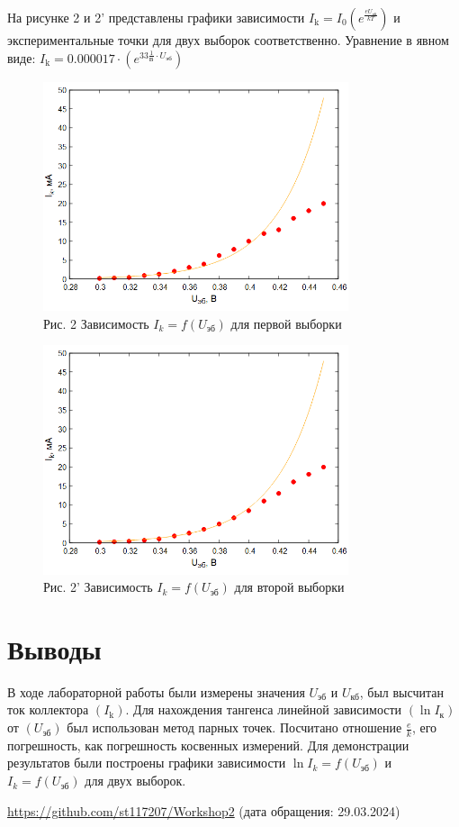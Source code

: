 На рисунке 2 и 2' представлены графики зависимости $    I_{\mathrm{k}} = I_{0} \left(e^{\frac{e U_{\text{эб}}}{k T}}\right)$ и экспериментальные точки для двух выборок соответственно. 
Уравнение в явном виде: $    I_{\mathrm{k}} = 0.000017\cdot \left(e^{33\frac{1}{\text{В}}\cdot{U_{\text{эб}}}}\right)$
\begin{figure}[H]
\centering
\includegraphics[width=0.8\textwidth]{График 3.png}
\caption*{Рис. 2 Зависимость $I_k=f(U_{\text{эб}})$ для первой выборки }
\label{fig:gist}
\end{figure}
\begin{figure}[H]
\centering
\includegraphics[width=0.8\textwidth]{График 4.png}
\caption*{Рис. 2' Зависимость $I_k=f(U_{\text{эб}})$ для второй выборки}
\label{fig:gist}
\end{figure}
\section{Выводы}
В ходе лабораторной работы были измерены значения $U_{\text{эб}}$ и $U_{\text{кб}}$, был высчитан ток коллектора $(I_{\text{k}})$. Для нахождения тангенса линейной зависимости $(\ln I_{\text{к}})$ от $(U_{\text{эб}})$ был использован метод парных точек. Посчитано отношение $\frac{e}{k}$, его погрешность, как погрешность косвенных измерений. Для демонстрации результатов были построены графики зависимости $\ln I_k=f(U_{\text{эб}})$ и $I_k=f(U_{\text{эб}})$ для двух выборок.


\begin{thebibliography}{9}

\url{https://github.com/st117207/Workshop2}  (дата обращения: 29.03.2024) 


\end{thebibliography}

